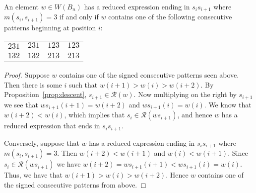 \begin{proposition}\label{lem:ts}
An element $w \in W(B_n)$ has a reduced expression ending in $s_is_{i+1}$ where $m(s_i,s_{i+1})=3$ if and only if $w$ contains one of the following consecutive patterns beginning at position $i$:
%
\begin{center}
\begin{tabular}{llll}
$231$             & $23\underbar{1}$ & $12 \underbar{3}$ & $\underbar{1}2\underbar{3}$  \\
$\underline{1}32$ & $13 \underbar{2}$ & $\underbar{2}1\underbar{3}$  & $\underbar{213}$ 

\end{tabular}	
\end{center}
%
\begin{proof}	
	Suppose $w$ contains one of the signed consecutive patterns seen above. Then there is some $i$ such that $w(i+1)>w(i)>w(i+2)$. By Proposition~\ref{prop:descent}, $s_{i+1} \in \mathcal{R}(w)$. Now multiplying on the right by $s_{i+1}$ we see that $ws_{i+1}(i+1)=w(i+2)$ and $ws_{i+1}(i)=w(i)$. We know that $w(i+2)<w(i)$, which implies that $s_i \in \mathcal{R}(ws_{i+1})$, and hence $w$ has a reduced expression that ends in $s_is_{i+1}$.
	
	 Conversely, suppose that $w$ has a reduced expression ending in $s_is_{i+1}$ where $m(s_i,s_{i+1})=3$. Then $w(i+2)<w(i+1)$ and $w(i)<w(i+1)$. Since $s_i \in \mathcal{R}(ws_{i+1})$ we have $w(i+2)=ws_{i+1}(i+1)<ws_{i+1}(i)=w(i)$. Thus, we have that $w(i+1) > w(i) > w(i+2)$. Hence $w$ contains one of the signed consecutive patterns from above.
\end{proof}	
\end{proposition}

%
%


